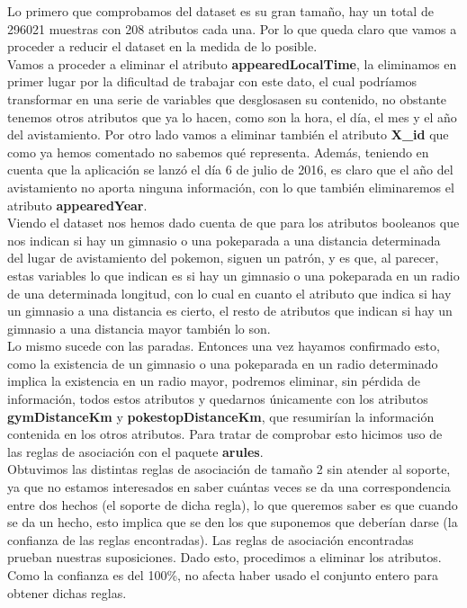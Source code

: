 Lo primero que comprobamos del dataset es su gran tamaño, hay un total de 296021 muestras con 208 atributos cada una. Por lo que queda claro que vamos a proceder a reducir el dataset en la medida de lo posible.\\

Vamos a proceder a eliminar el atributo \textbf{appearedLocalTime}, la eliminamos en primer lugar por la dificultad de trabajar con este dato, el cual podríamos transformar en una serie de variables que desglosasen su contenido, no obstante tenemos otros atributos que ya lo hacen, como son la hora, el día, el mes y el año del avistamiento. Por otro lado vamos a eliminar también el atributo \textbf{X\_id} que como ya hemos comentado no sabemos qué representa. Además, teniendo en cuenta que la aplicación se lanzó el día 6 de julio de 2016, es claro que el año del avistamiento no aporta ninguna información, con lo que también eliminaremos el atributo \textbf{appearedYear}.\\

Viendo el dataset nos hemos dado cuenta de que para los atributos booleanos que nos indican si hay un gimnasio o una pokeparada a una distancia determinada del lugar de avistamiento del pokemon, siguen un patrón, y es que, al parecer, estas variables lo que indican es si hay un gimnasio o una pokeparada en un radio de una determinada longitud, con lo cual en cuanto el atributo que indica si hay un gimnasio a una distancia es cierto, el resto de atributos que indican si hay un gimnasio a una distancia mayor también lo son. \\

Lo mismo sucede con las paradas. Entonces una vez hayamos confirmado esto, como la existencia de un gimnasio o una pokeparada en un radio determinado implica la existencia en un radio mayor, podremos eliminar, sin pérdida de información, todos estos atributos y quedarnos únicamente con los atributos \textbf{gymDistanceKm} y \textbf{pokestopDistanceKm}, que resumirían la información contenida en los otros atributos. Para tratar de comprobar esto hicimos uso de las reglas de asociación con el paquete \textbf{arules}.\\

Obtuvimos las distintas reglas de asociación de tamaño 2 sin atender al soporte, ya que no estamos interesados en saber cuántas veces se da una correspondencia entre dos hechos (el soporte de dicha regla), lo que queremos saber es que cuando se da un hecho, esto implica que se den los que suponemos que deberían darse (la confianza de las reglas encontradas). Las reglas de asociación encontradas prueban nuestras suposiciones. Dado esto, procedimos a eliminar los atributos. Como la confianza es del 100\%, no afecta haber usado el conjunto entero para obtener dichas reglas.\\

